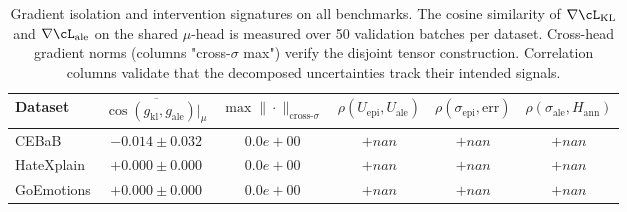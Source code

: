 \begin{table}[t]
\centering
\caption{Gradient isolation and intervention signatures on all benchmarks.
The cosine similarity of $\nabla \cL_{\text{KL}}$ and $\nabla \cL_{\text{ale}}$
on the shared $\mu$-head is measured over 50 validation batches per dataset.
Cross-head gradient norms (columns "cross-$\sigma$ max") verify the disjoint
tensor construction. Correlation columns validate that the decomposed
uncertainties track their intended signals.}
\label{tab:grad-iso-validity}
\small
\begin{tabular}{lccccc}
\toprule
Dataset & $\overline{\cos(g_{\text{kl}}, g_{\text{ale}})|_{\mu}}$
        & $\max \|{\cdot}\|_{\text{cross-}\sigma}$
        & $\rho(U_{\text{epi}}, U_{\text{ale}})$
        & $\rho(\sigma_{\text{epi}}, \text{err})$
        & $\rho(\sigma_{\text{ale}}, H_{\text{ann}})$ \\
\midrule
CEBaB & $-0.014 \pm 0.032$ & $0.0e+00$ & $+nan$ & $+nan$ & $+nan$ \\
HateXplain & $+0.000 \pm 0.000$ & $0.0e+00$ & $+nan$ & $+nan$ & $+nan$ \\
GoEmotions & $+0.000 \pm 0.000$ & $0.0e+00$ & $+nan$ & $+nan$ & $+nan$ \\
\bottomrule
\end{tabular}
\end{table}
